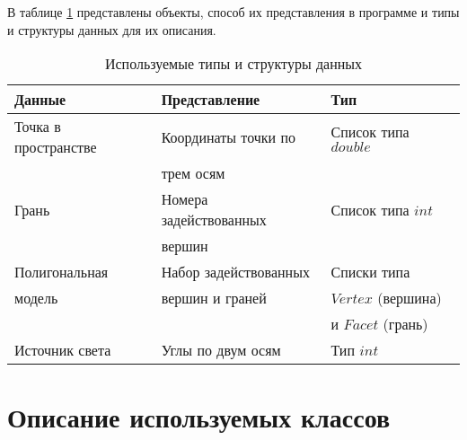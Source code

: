 В таблице \ref{tbl:types} представлены объекты, способ их представления в программе и типы и структуры данных для их описания.

\begin{table}[h]
\begin{center}
    \captionsetup{justification=raggedleft}
    \caption{\label{tbl:types}Используемые типы и структуры данных}
    \begin{tabular}{|l|l|l|}
        \hline
        Данные & Представление & Тип\\
        \hline
        Точка в пространстве & Координаты точки по & Список типа $double$ \\ 
                             & трем осям     &                      \\ 
        \hline
        Грань & Номера задействованных & Список типа $int$ \\ 
              & вершин                 &                   \\ 
        \hline
        Полигональная        & Набор задействованных & Списки типа \\ 
        модель               & вершин и граней       & $Vertex$ (вершина) \\
                             &                       & и $Facet$ (грань) \\ 

        \hline
        Источник света & Углы по двум осям & Тип $int$ \\ 
        \hline
    \end{tabular}
\end{center}
\end{table}

\section{Описание используемых классов}

